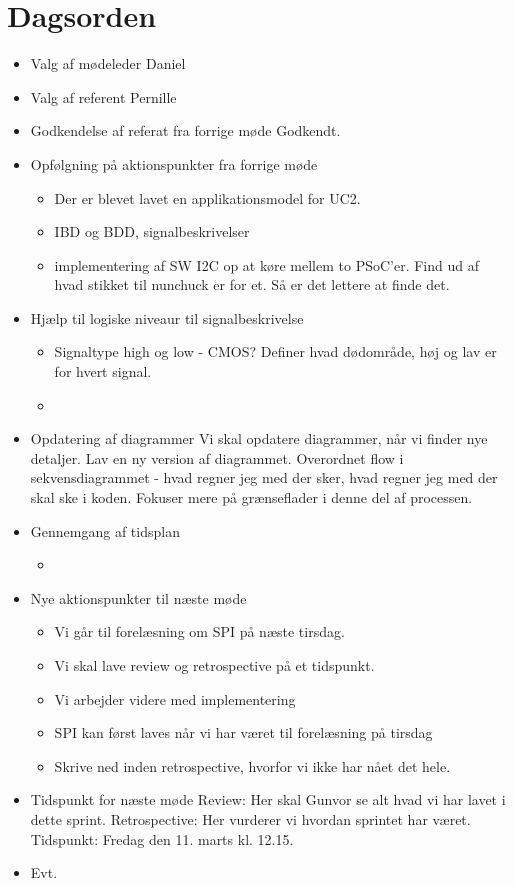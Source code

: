 \documentclass{article}
\begin{document}
	\section{Dagsorden}
	\begin{itemize}
			\item Valg af mødeleder
			\subitem Daniel
			\item Valg af referent
			Pernille
			\item Godkendelse af referat fra forrige møde 
			Godkendt.
			\item Opfølgning på aktionspunkter fra forrige møde
				\begin{itemize}
					\item Der er blevet lavet en applikationsmodel for UC2. 
					\item IBD og BDD, signalbeskrivelser
					\item implementering af SW
					\subitem I2C op at køre mellem to PSoC'er. 
					\subitem Find ud af hvad stikket til nunchuck er for et. Så er det lettere at finde det. 
				\end{itemize}
				
			\item Hjælp til logiske niveaur til signalbeskrivelse
				\begin{itemize}
					\item Signaltype high og low - CMOS? Definer hvad dødområde, høj og lav er for hvert signal. 
					\item 
				\end{itemize}
			
			\item Opdatering af diagrammer
			\subitem Vi skal opdatere diagrammer, når vi finder nye detaljer. Lav en ny version af diagrammet. 
			\subitem Overordnet flow i sekvensdiagrammet - hvad regner jeg med der sker, hvad regner jeg med der skal ske i koden. Fokuser mere på grænseflader i denne del af processen. 
				
			\item Gennemgang af tidsplan
				\begin{itemize}
					\item 
				\end{itemize}
				
			\item Nye aktionspunkter til næste møde
				\begin{itemize}
					\item Vi går til forelæsning om SPI på næste tirsdag. 
					\item Vi skal lave review og retrospective på et tidspunkt. 
					\item Vi arbejder videre med implementering 
					\item SPI kan først laves når vi har været til forelæsning på tirsdag
					\item Skrive ned inden retrospective, hvorfor vi ikke har nået det hele. 
				\end{itemize}
			\item Tidspunkt for næste møde
			\subitem Review: Her skal Gunvor se alt hvad vi har lavet i dette sprint. 
			\subitem Retrospective: Her vurderer vi hvordan sprintet har været. 
			\subitem Tidspunkt: Fredag den 11. marts kl. 12.15. 
			
			\item Evt. 
			
	\end{itemize}
\end{document}
